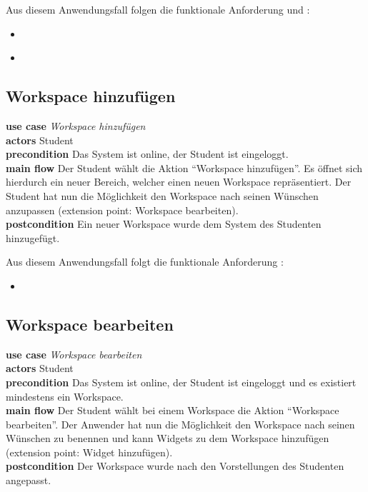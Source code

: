 Aus diesem Anwendungsfall folgen die funktionale Anforderung  und :
\begin{itemize}
 \item \requirement{\requirementLogout}\label{requirementLogout}
 \item \requirement{\requirementKeinZugriffNachLogout}\label{requirementKeinZugriffNachLogout}
\end{itemize}

\subsection{Workspace hinzufügen}
\textbf{use case} \emph{Workspace hinzufügen}\\
\textbf{actors} Student\\
\textbf{precondition} Das System ist online, der Student ist eingeloggt.\\
\textbf{main flow} Der Student wählt die Aktion "`Workspace hinzufügen"'. Es öffnet sich hierdurch ein neuer Bereich, welcher einen neuen Workspace repräsentiert. Der Student hat nun die Möglichkeit den Workspace nach seinen Wünschen anzupassen (extension point: Workspace bearbeiten).\\
\textbf{postcondition} Ein neuer Workspace wurde dem System des Studenten hinzugefügt.
 
Aus diesem Anwendungsfall folgt die funktionale Anforderung :
\begin{itemize}
 \item \requirement{\requirementWorkspaceAdd}\label{requirementWorkspaceAdd}
\end{itemize}
 
\subsection{Workspace bearbeiten}
\textbf{use case} \emph{Workspace bearbeiten}\\
\textbf{actors} Student\\
\textbf{precondition} Das System ist online, der Student ist eingeloggt und es existiert mindestens ein Workspace.\\
\textbf{main flow} Der Student wählt bei einem Workspace die Aktion "`Workspace bearbeiten"'. Der Anwender hat nun die Möglichkeit den Workspace nach seinen Wünschen zu benennen und kann Widgets zu dem Workspace hinzufügen (extension point: Widget hinzufügen).\\
\textbf{postcondition} Der Workspace wurde nach den Vorstellungen des Studenten angepasst.
 
